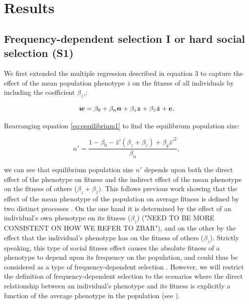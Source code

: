 \documentclass{article}
\begin{document}
\section{Results}
\subsection{Frequency-dependent selection I or hard social selection (S1)}

We first extended the multiple regression described in equation 3 to capture the effect of the mean population phenotype $\bar{z}$ on the fitness of all individuals by including the coefficient $\beta_{\bar{z}}$,:  
  
\begin{equation} \label{eq: socialselection}
\vectorsym{w}=\beta_{0} +\beta_{n} \vectorsym{n} + \beta_{z} \vectorsym{z}+ \beta_{\bar{z}} \bar{\vectorsym{z}}+ \vectorsym{e}.
\end{equation}
 
\noindent Rearranging equation \ref{eq:equilibrium1} to find the equilibrium population size:
 
\begin{equation}
n' = \frac{1-\beta_{0} - \bar{z}'(\beta_{z} + \beta_{\bar{z}} )+  \beta_{q} \bar{z}'^2}{\beta_{n}},
\end{equation}

\noindent we can see that equilibrium population size $n'$ depends upon both the direct effect of the phenotype on fitness and the indirect effect of the mean phenotype on the fitness of others ($\beta_{z} + \beta_{\bar{z}})$. This follows previous work showing that the effect of the mean phenotype of the population on average fitness is defined by two distinct processes \citep{Engen2020, Lande2007, Abrams1993}. On the one hand it is determined by the effect of an individual's own phenotype on its fitness ($\beta_{z}$) ("NEED TO BE MORE CONSISTENT ON HOW WE REFER TO ZBAR"), and on the other by the effect that the individual's phenotype has on the fitness of others ($\beta_{\bar{z}}$). Strictly speaking, this type of social fitness effect causes the absolute fitness of a phenotype to depend upon its frequency on the population, and could thus be considered as a type of frequency-dependent selection \citep{Heino1998}. However, we will restrict the definition of frequency-dependent selection to the scenarios where the direct relationship between an individual's phenotype and its fitness is explicitly a function of the average phenotype in the population (see \cite{Araya-Ajoy2020}).
\end{document}
